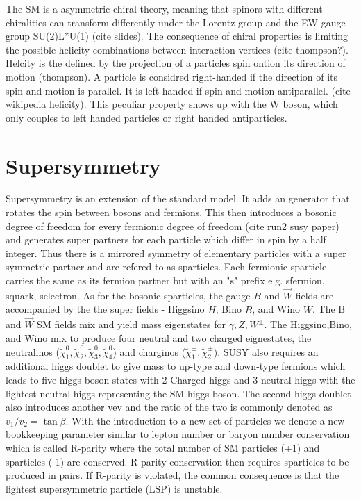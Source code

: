 The SM is a asymmetric chiral theory, meaning that spinors with different chiralities can
transform differently under the Lorentz group and the EW gauge group
SU(2)L*U(1) (cite slides).  The consequence of chiral properties is limiting the possible helicity combinations between interaction vertices (cite thompson?). Helcity is the defined by the projection of a particles spin ontion its direction of motion (thompson). A particle is considred right-handed if the direction of its spin and motion is parallel. It is left-handed if spin and motion antiparallel. (cite wikipedia helicity). This peculiar property shows up with the W boson, which only couples to left handed particles or right handed antiparticles.

\section{Supersymmetry}

Supersymmetry is an extension of the standard model. It adds an generator that rotates the spin between bosons and fermions. This then introduces a bosonic degree of freedom for every fermionic degree of freedom (cite run2 susy paper) and generates super partners for each particle which differ in spin by a half integer.  Thus there is a mirrored symmetry of elementary particles with a super symmetric partner and are refered to as sparticles. Each fermionic sparticle carries the same as its fermion partner but with an "s" prefix e.g. sfermion, squark, selectron. As for the bosonic sparticles, the gauge $B$ and $\vec{W}$  fields are accompanied by the the super fields - Higgsino $\tilde{H}$, Bino $\tilde{B}$, and Wino $\tilde{W}$. The B and $\vec{W}$ SM fields mix and yield mass eigenstates for $\gamma, Z, W^\pm$. The Higgsino,Bino, and Wino mix to produce four neutral and two charged eignestates, the neutralinos ($\tilde{\chi}^0_1, \tilde{\chi}^0_2, \tilde{\chi}^0_3, \tilde{\chi}^0_4$)  and charginos ($\tilde{\chi}^\pm_1, \tilde{\chi}^\pm_2$). SUSY also requires an additional higgs doublet to give mass to up-type and down-type fermions which leads to five higgs boson states with 2 Charged higgs and 3 neutral higgs with the lightest neutral higgs representing the SM higgs boson. The second higgs doublet also introduces another vev and the ratio of the two is commonly denoted as $v_1/v_2 = \tan \beta$. With the introduction to a new set of particles we denote a new bookkeeping parameter similar to lepton number or baryon number conservation which is called R-parity where the total number of SM particles (+1) and sparticles (-1) are conserved. R-parity conservation then requires sparticles to be produced in pairs. If R-parity is violated, the common consequence is that the lightest supersymmetric particle (LSP) is unstable. 


